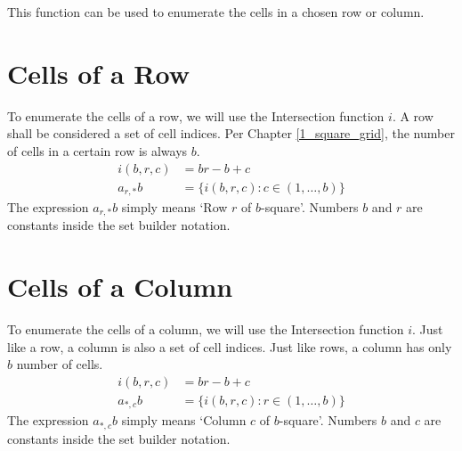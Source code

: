\documentclass[letterpaper, twoside,12pt]{book}
\begin{document}
    This function can be used to enumerate the cells in a chosen row or column.

    \section{Cells of a Row} \label{row_cells}
    To enumerate the cells of a row, we will use the Intersection function $i$. A row shall be considered a set of cell indices. Per Chapter \ref{1_square_grid}, the number of cells in a certain row is always $b$.
    \begin{equation}
        \begin{split}
            i(b,r,c) &= br - b + c \\
            a_{r,*}b &= \{ i(b,r,c) : c \in (1, \dots, b) \}
        \end{split}
    \end{equation}
    The expression $a_{r,*}b$ simply means `Row $r$ of $b$-square'. Numbers $b$ and $r$ are constants inside the set builder notation.

    \section{Cells of a Column} \label{column_cells}
    To enumerate the cells of a column, we will use the Intersection function $i$. Just like a row, a column is also a set of cell indices. Just like rows, a column has only $b$ number of cells.
    \begin{equation}
        \begin{split}
            i(b,r,c) &= br - b + c \\
            a_{*,c}b &= \{ i(b,r,c) : r \in (1, \dots, b) \}
        \end{split}
    \end{equation}
    The expression $a_{*,c}b$ simply means `Column $c$ of $b$-square'. Numbers $b$ and $c$ are constants inside the set builder notation.
\end{document}
